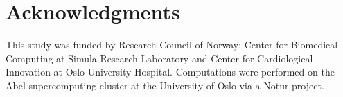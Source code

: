 \documentclass[times]{elsarticle}
\begin{document}

\section*{Acknowledgments}
This study was funded by Research Council of Norway: Center for
Biomedical Computing at Simula Research Laboratory and Center for
Cardiological Innovation at Oslo University Hospital.
Computations were performed on the Abel supercomputing cluster at the 
University of Oslo via a Notur project.










\end{document}
